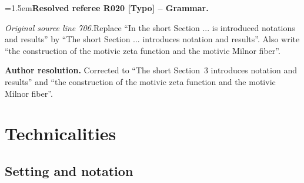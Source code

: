 \documentclass[12pt]{amsart}
\newcommand{\ResolvedRefereeRemark}[5]{%
  \par\medskip\begingroup\normalfont\small\color{gray}%
  \emergencystretch=1.5em\noindent\textbf{Resolved referee R#1 [#2] -- #3.}\par\nobreak\noindent #4\par
  \medskip\color{ResolutionGreen}\noindent\textbf{Author resolution.} #5\par
  \endgroup\medskip
}
\theoremstyle{plain}
\theoremstyle{definition}
\theoremstyle{remark}
\numberwithin{equation}{section}
\theoremstyle{plain}
\newcommand{\0}{\emptyset}
\begin{document}
\ResolvedRefereeRemark{020}{Typo}{Grammar}{%
\textit{Original source line 706.}\quad Replace ``In the short Section ... is introduced notations and results'' by ``The short Section ... introduces notation and results''. Also write ``the construction of the motivic zeta function and the motivic Milnor fiber''. 
}{Corrected to ``The short Section~3 introduces notation and results'' and ``the construction of the motivic zeta function and the motivic Milnor fiber''.}



\section{Technicalities}
\label{sec-tech}

\subsection{Setting and notation}\label{sec:notation}
\end{document}
